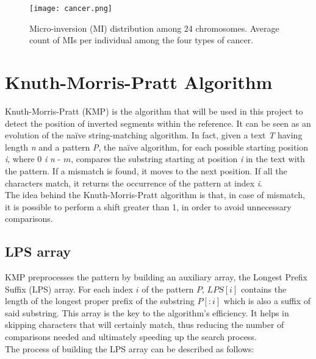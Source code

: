 \begin{figure}[h]

  \centering
    \texttt{[image: cancer.png]}

  \caption{Micro-inversion (MI) distribution among 24 chromosomes.  Average count of MIs per individual among the four types of cancer.}
  \label{fig:cancer}
\end{figure}
\newpage
\section{Knuth-Morris-Pratt Algorithm}

Knuth-Morris-Pratt \cite{knuth_fast_1977} (KMP) is the algorithm that will be used in this project to detect the position of inverted segments within the reference. It can be seen as an evolution of the naïve string-matching algorithm. In fact, given a text \textit{T} having length \textit{n} and a pattern \textit{P}, the naïve algorithm, for each possible starting position \textit{i}, where 0 \leq \textit{i} \leq \textit{n} - \( m \), compares the substring starting at position \textit{i} in the text with the pattern. If a mismatch is found, it moves to the next position. If all the characters match, it returns the occurrence of the pattern at index \textit{i}. \\
The idea behind the Knuth-Morris-Pratt algorithm is that, in case of mismatch, it is possible to perform a shift greater than 1, in order to avoid unnecessary comparisons. 

\subsection{LPS array}
KMP preprocesses the pattern by building an auxiliary array, the Longest Prefix Suffix (LPS) array. For each index \( i \) of the pattern \( P \), \( LPS[i] \) contains the length of the longest proper prefix of the substring \( P[:i] \) which is also a suffix of said substring. This array is the key to the algorithm’s efficiency. It helps in skipping characters that will certainly match, thus reducing the number of comparisons needed and ultimately speeding up the search process.  \\
The process of building the LPS array can be described as follows:

